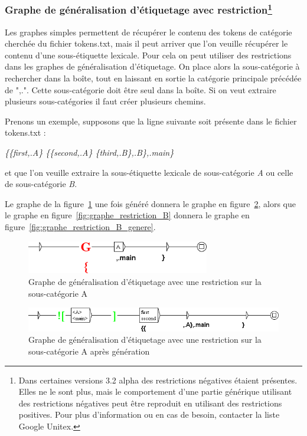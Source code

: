 \subsubsection{Graphe de généralisation d'étiquetage avec restriction\protect\footnote{Dans certaines versions 3.2 alpha des restrictions négatives étaient présentes. Elles ne le sont plus, mais le comportement d'une partie générique utilisant des restrictions négatives peut être reproduit en utilisant des restrictions positives. Pour plus d'information ou en cas de besoin, contacter la liste Google Unitex.}}

Les graphes simples permettent de récupérer le contenu des tokens de catégorie cherchée du fichier tokens.txt, mais il peut arriver que l'on veuille récupérer le contenu d'une sous-étiquette lexicale. Pour cela on peut utiliser des restrictions dans les graphes de généralisation d'étiquetage. On place alors la sous-catégorie à rechercher dans la boîte, tout en laissant en sortie la catégorie principale précédée de ",.". Cette sous-catégorie doit être seul dans la boîte. Si on veut extraire plusieurs sous-catégories il faut créer plusieurs chemins.


\bigskip
Prenons un exemple, supposons que la ligne suivante soit présente dans le fichier tokens.txt :


\emph{\{\{first,.A\} \{\{second,.A\} \{third,.B\},.B\},.main\}}

et que l'on veuille extraire la sous-étiquette lexicale de sous-catégorie \textit{A} ou celle de sous-catégorie \textit{B}.

\bigskip
Le graphe de la figure~\ref{fig:graphe_restriction_A} une fois généré donnera le graphe en figure~\ref{fig:graphe_restriction_A_genere}, alors que le graphe en figure~\ref{fig:graphe_restriction_B} donnera le graphe en figure~\ref{fig:graphe_restriction_B_genere}.


\begin{figure}[!htb]
  \centering
  \includegraphics[width=8cm]{resources/img/graphe_restriction_A.png}
  \caption{Graphe de généralisation d'étiquetage avec une restriction sur la sous-catégorie A}
  \label{fig:graphe_restriction_A}
\end{figure}

\begin{figure}[!htb]
  \centering
  \includegraphics[width=14cm]{resources/img/graphe_restriction_A_genere.png}
  \caption{Graphe de généralisation d'étiquetage avec une restriction sur la sous-catégorie A après génération}
  \label{fig:graphe_restriction_A_genere}
\end{figure}

